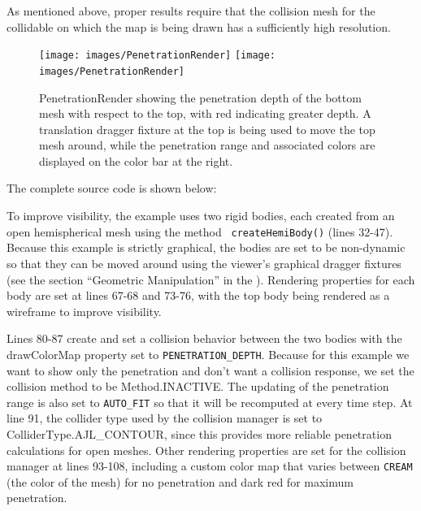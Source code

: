 \begin{sideblock}
As mentioned above, proper results require that the collision mesh for
the collidable on which the map is being drawn has a sufficiently high
resolution.
\end{sideblock}

\begin{figure}[ht]
\begin{center}
\iflatexml
 \texttt{[image: images/PenetrationRender]}
\else
 \texttt{[image: images/PenetrationRender]}
\fi
\end{center}
\caption{PenetrationRender showing the penetration depth of the bottom
mesh with respect to the top, with red indicating greater depth.
A translation dragger fixture at the top is being used to 
move the top mesh around, while the penetration range and
associated colors are displayed on the color bar at the right.}
\label{PenetrationRender:fig}
\end{figure}

The complete source code is shown below:
%
\lstset{numbers=left}

\lstset{numbers=none} 

To improve visibility, the example uses two rigid bodies, each created
from an open hemispherical mesh using the method {\tt
createHemiBody()} (lines 32-47). Because this example is strictly
graphical, the bodies are set to be non-dynamic so that they can be
moved around using the viewer's graphical dragger fixtures (see the
section ``Geometric Manipulation'' in the
). 
Rendering properties for each body are set at lines
67-68 and 73-76, with the top body being rendered as a wireframe to
improve visibility.

Lines 80-87 create and set a collision behavior between the two bodies
with the {\sf drawColorMap} property set to
{\tt PENETRATION\_DEPTH}. Because for this example we
want to show only the penetration and don't want a collision response,
we set the collision method to be %
{Method.INACTIVE}. The updating of the penetration range is also set
to {\tt AUTO\_FIT} so that it will be recomputed at every time step.
At line 91, the collider type used by the collision manager is set to
%
{ColliderType.AJL\_CONTOUR}, since this provides more reliable penetration
calculations for open meshes.
Other rendering properties are set for the collision manager at lines
93-108, including a custom color map that varies between {\tt CREAM}
(the color of the mesh) for no penetration and dark red for maximum
penetration.

